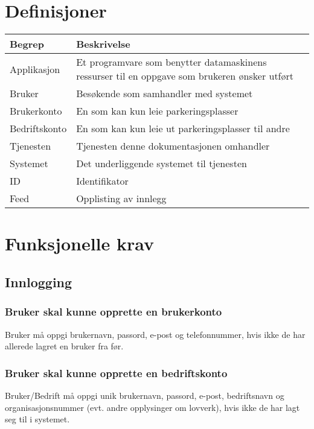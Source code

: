 \documentclass[12pt]{article}
\begin{document}
\section{Definisjoner}

\begin{center}
    \begin{tabular}{|p{4cm}|p{12cm}| } 
        \hline
        \bf Begrep & \bf Beskrivelse \\
        \hline
        Applikasjon &  Et programvare som benytter datamaskinens ressurser til en oppgave som brukeren ønsker utført \\
        \hline
        Bruker & Besøkende som samhandler med systemet \\
        \hline
        Brukerkonto & En som kan kun leie parkeringsplasser \\
        \hline
        Bedriftskonto & En som kan kun leie ut parkeringsplasser til andre \\
        \hline
        Tjenesten & Tjenesten denne dokumentasjonen omhandler \\
        \hline
        Systemet & Det underliggende systemet til tjenesten \\
        \hline
        ID & Identifikator \\
        \hline
        Feed & Opplisting av innlegg \\
        \hline
    \end{tabular}
\end{center}

\section{Funksjonelle krav}

\subsection{Innlogging}

\subsubsection{Bruker skal kunne opprette en brukerkonto}
Bruker må oppgi brukernavn, passord, e-post og telefonnummer, hvis ikke de har allerede lagret en bruker fra før.

\subsubsection{Bruker skal kunne opprette en bedriftskonto}
Bruker/Bedrift må oppgi unik brukernavn, passord, e-post, bedriftsnavn og organisasjonsnummer (evt. andre opplysinger om lovverk), hvis ikke de har lagt seg til i systemet.
\end{document}
